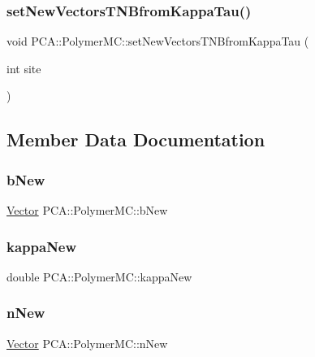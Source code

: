 \subsubsection{\texorpdfstring{set\+New\+Vectors\+T\+N\+Bfrom\+Kappa\+Tau()}{setNewVectorsTNBfromKappaTau()}}
{\footnotesize\ttfamily void P\+C\+A\+::\+Polymer\+M\+C\+::set\+New\+Vectors\+T\+N\+Bfrom\+Kappa\+Tau (\begin{DoxyParamCaption}\item[{int}]{site }\end{DoxyParamCaption})}



\subsection{Member Data Documentation}
\hypertarget{class_p_c_a_1_1_polymer_m_c_a69019643d3a1fd92b8c77647bb4a91d6}{}\label{class_p_c_a_1_1_polymer_m_c_a69019643d3a1fd92b8c77647bb4a91d6} 
\subsubsection{\texorpdfstring{b\+New}{bNew}}
{\footnotesize\ttfamily \hyperlink{class_p_c_a_1_1_vector}{Vector} P\+C\+A\+::\+Polymer\+M\+C\+::b\+New\hspace{0.3cm}{\ttfamily [private]}}

\hypertarget{class_p_c_a_1_1_polymer_m_c_a6771be27571e5c106546eb5225edec05}{}\label{class_p_c_a_1_1_polymer_m_c_a6771be27571e5c106546eb5225edec05} 
\subsubsection{\texorpdfstring{kappa\+New}{kappaNew}}
{\footnotesize\ttfamily double P\+C\+A\+::\+Polymer\+M\+C\+::kappa\+New\hspace{0.3cm}{\ttfamily [private]}}

\hypertarget{class_p_c_a_1_1_polymer_m_c_a5e493ca12a3eba2f1658ac1cccba3d56}{}\label{class_p_c_a_1_1_polymer_m_c_a5e493ca12a3eba2f1658ac1cccba3d56} 
\subsubsection{\texorpdfstring{n\+New}{nNew}}
{\footnotesize\ttfamily \hyperlink{class_p_c_a_1_1_vector}{Vector} P\+C\+A\+::\+Polymer\+M\+C\+::n\+New\hspace{0.3cm}{\ttfamily [private]}}

